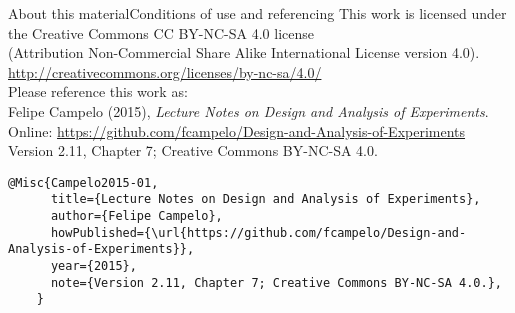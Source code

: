 \documentclass[t]{beamer}
\begin{document}
\begin{ftstf}{About this material}{Conditions of use and referencing}
\centering\footnotesize This work is licensed under the Creative Commons CC BY-NC-SA 4.0 license\\(Attribution Non-Commercial Share Alike International License version 4.0).\\
\vhalf
\url{http://creativecommons.org/licenses/by-nc-sa/4.0/}\\
\vone
\footnotesize Please reference this work as:\\
\footnotesize \flushleft Felipe Campelo (2015), \textit{Lecture Notes on Design and Analysis of Experiments}.\\Online: {\scriptsize\url{https://github.com/fcampelo/Design-and-Analysis-of-Experiments}}\\
Version 2.11, Chapter 7; Creative Commons BY-NC-SA 4.0.\\

\begin{Verbatim}[fontsize=\tiny]
    @Misc{Campelo2015-01,
      title={Lecture Notes on Design and Analysis of Experiments},
      author={Felipe Campelo},
      howPublished={\url{https://github.com/fcampelo/Design-and-Analysis-of-Experiments}},
      year={2015},
      note={Version 2.11, Chapter 7; Creative Commons BY-NC-SA 4.0.},
    }
\end{Verbatim}

\end{ftstf}
\end{document}
